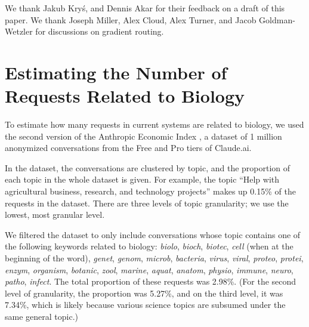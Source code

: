 \documentclass{article}
\theoremstyle{plain}
\theoremstyle{definition}
\theoremstyle{remark}
\begin{document}
We thank Jakub Kryś, and Dennis Akar for their feedback on a draft of this paper. We thank Joseph Miller, Alex Cloud, Alex Turner, and Jacob Goldman-Wetzler for discussions on gradient routing.




\newpage
\appendix

\section{Estimating the Number of Requests Related to Biology} \label{appendix:estimating-biology-requests}

To estimate how many requests in current systems are related to biology, we used the second version of the Anthropic Economic Index \cite{handa2025economictasksperformedai}, a dataset of 1 million anonymized conversations from the Free and Pro tiers of Claude.ai.

In the dataset, the conversations are clustered by topic, and the proportion of each topic in the whole dataset is given.
For example, the topic ``Help with agricultural business, research, and technology projects'' makes up 0.15\% of the requests in the dataset.
There are three levels of topic granularity; we use the lowest, most granular level.

We filtered the dataset to only include conversations whose topic contains one of the following keywords related to biology: \emph{biolo}, \emph{bioch}, \emph{biotec}, \emph{cell} (when at the beginning of the word), \emph{genet}, \emph{genom}, \emph{microb}, \emph{bacteria}, \emph{virus}, \emph{viral}, \emph{proteo}, \emph{protei}, \emph{enzym}, \emph{organism}, \emph{botanic}, \emph{zool}, \emph{marine}, \emph{aquat}, \emph{anatom}, \emph{physio}, \emph{immune}, \emph{neuro}, \emph{patho}, \emph{infect}.
The total proportion of these requests was 2.98\%.
(For the second level of granularity, the proportion was 5.27\%, and on the third level, it was 7.34\%, which is likely because various science topics are subsumed under the same general topic.)
\end{document}
